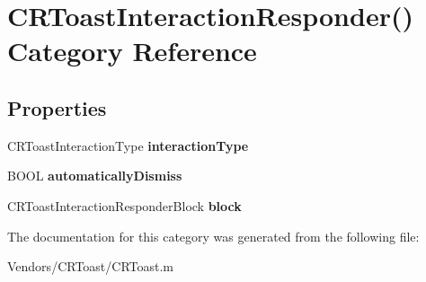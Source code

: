 \hypertarget{category_c_r_toast_interaction_responder_07_08}{}\section{C\+R\+Toast\+Interaction\+Responder() Category Reference}
\label{category_c_r_toast_interaction_responder_07_08}
\subsection*{Properties}
\begin{DoxyCompactItemize}
\item 
\hypertarget{category_c_r_toast_interaction_responder_07_08_a2657a1f21efd547b2f395fea83c2f064}{}C\+R\+Toast\+Interaction\+Type {\bfseries interaction\+Type}\label{category_c_r_toast_interaction_responder_07_08_a2657a1f21efd547b2f395fea83c2f064}

\item 
\hypertarget{category_c_r_toast_interaction_responder_07_08_aa9a642dc490927472f44b29d783ff788}{}B\+O\+O\+L {\bfseries automatically\+Dismiss}\label{category_c_r_toast_interaction_responder_07_08_aa9a642dc490927472f44b29d783ff788}

\item 
\hypertarget{category_c_r_toast_interaction_responder_07_08_ab21d792fba930c4050b3c4be561f1ccc}{}C\+R\+Toast\+Interaction\+Responder\+Block {\bfseries block}\label{category_c_r_toast_interaction_responder_07_08_ab21d792fba930c4050b3c4be561f1ccc}

\end{DoxyCompactItemize}


The documentation for this category was generated from the following file\+:\begin{DoxyCompactItemize}
\item 
Vendors/\+C\+R\+Toast/C\+R\+Toast.\+m\end{DoxyCompactItemize}
